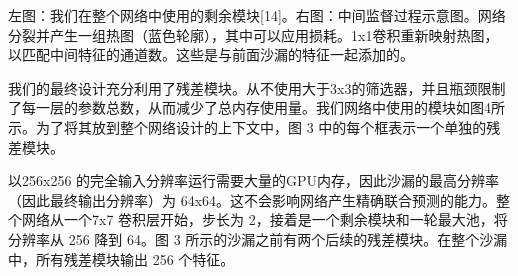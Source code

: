 左图：我们在整个网络中使用的剩余模块[14]。右图：中间监督过程示意图。网络分裂并产生一组热图（蓝色轮廓），其中可以应用损耗。1x1卷积重新映射热图，以匹配中间特征的通道数。这些是与前面沙漏的特征一起添加的。 

我们的最终设计充分利用了残差模块。从不使用大于3x3的筛选器，并且瓶颈限制了每一层的参数总数，从而减少了总内存使用量。我们网络中使用的模块如图4所示。为了将其放到整个网络设计的上下文中，图 3 中的每个框表示一个单独的残差模块。 

以256x256 的完全输入分辨率运行需要大量的GPU内存，因此沙漏的最高分辨率（因此最终输出分辨率）为 64x64。这不会影响网络产生精确联合预测的能力。整个网络从一个7x7 卷积层开始，步长为 2，接着是一个剩余模块和一轮最大池，将分辨率从 256 降到 64。图 3 所示的沙漏之前有两个后续的残差模块。在整个沙漏中，所有残差模块输出 256 个特征。 


